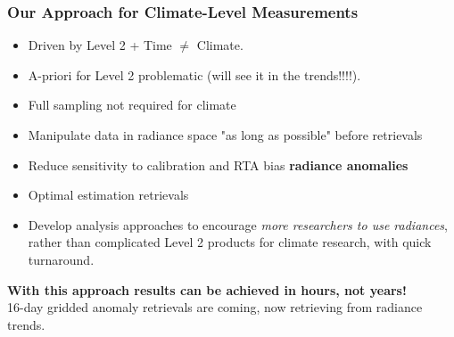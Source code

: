 \documentclass[10pt,t]{beamer}
\begin{document}
\begin{frame}
\frametitle{Our Approach for Climate-Level Measurements}  
\vspace{-0.1in}
\begin{itemize}
\item Driven by Level 2 + Time \(\neq\) Climate.  
\item A-priori for Level 2 problematic (will see it in the trends!!!!).
\item Full sampling not required for climate
\item Manipulate data in radiance space "as long as possible" before retrievals
\item Reduce sensitivity to calibration and RTA bias \textbf{radiance anomalies}
\item Optimal estimation retrievals %
\item Develop analysis approaches to encourage \emph{more researchers to use radiances}, rather than complicated Level 2 products for climate research, with quick turnaround.
\end{itemize}

\textbf{With this approach results can be achieved in hours, not years!}   \\

\vspace{0.1in}
16-day gridded anomaly retrievals are coming, now retrieving from radiance trends.
\end{frame}
\end{document}
